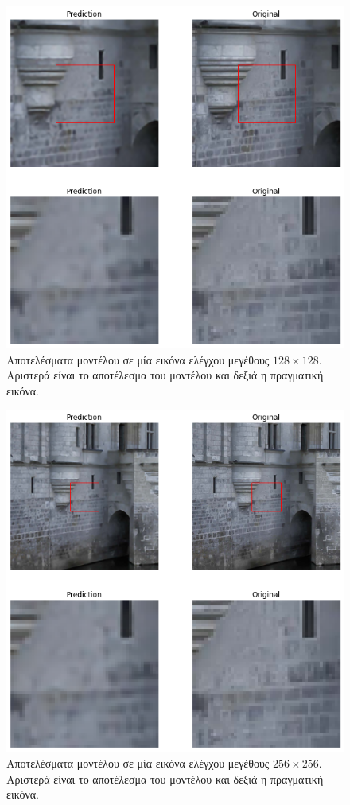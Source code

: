 \documentclass[a4paper]{article}
\begin{document}
\begin{figure}[H]
    \centering

    \includegraphics[width=.5\linewidth]{prediction_image_128.png}

    \caption{Αποτελέσματα μοντέλου σε μία εικόνα ελέγχου μεγέθους
    $128\times128$. Αριστερά είναι το αποτέλεσμα του μοντέλου και δεξιά η
    πραγματική εικόνα.}
    \label{fig:prediction_image_128}
\end{figure}


\begin{figure}[H]
    \centering

    \includegraphics[width=.5\linewidth]{prediction_image_256.png}

    \caption{Αποτελέσματα μοντέλου σε μία εικόνα ελέγχου μεγέθους
    $256\times256$. Αριστερά είναι το αποτέλεσμα του μοντέλου και δεξιά η
    πραγματική εικόνα.}
    \label{fig:prediction_image_256}
\end{figure}
\end{document}
